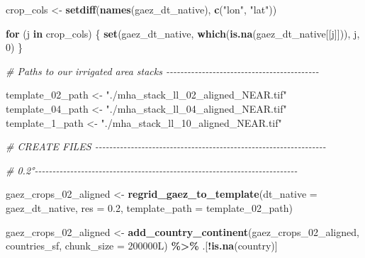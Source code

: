 \documentclass[
  11pt,
]{article}
\newenvironment{Shaded}{\begin{snugshade}}{\end{snugshade}}
\newcommand{\AttributeTok}[1]{\textcolor[rgb]{0.13,0.29,0.53}{#1}}
\newcommand{\CommentTok}[1]{\textcolor[rgb]{0.56,0.35,0.01}{\textit{#1}}}
\newcommand{\ControlFlowTok}[1]{\textcolor[rgb]{0.13,0.29,0.53}{\textbf{#1}}}
\newcommand{\DataTypeTok}[1]{\textcolor[rgb]{0.13,0.29,0.53}{#1}}
\newcommand{\DecValTok}[1]{\textcolor[rgb]{0.00,0.00,0.81}{#1}}
\newcommand{\FloatTok}[1]{\textcolor[rgb]{0.00,0.00,0.81}{#1}}
\newcommand{\FunctionTok}[1]{\textcolor[rgb]{0.13,0.29,0.53}{\textbf{#1}}}
\newcommand{\NormalTok}[1]{#1}
\newcommand{\OtherTok}[1]{\textcolor[rgb]{0.56,0.35,0.01}{#1}}
\newcommand{\SpecialCharTok}[1]{\textcolor[rgb]{0.81,0.36,0.00}{\textbf{#1}}}
\newcommand{\StringTok}[1]{\textcolor[rgb]{0.31,0.60,0.02}{#1}}
\begin{document}
\begin{Shaded}
\begin{Highlighting}[]
\NormalTok{crop\_cols }\OtherTok{\textless{}{-}} \FunctionTok{setdiff}\NormalTok{(}\FunctionTok{names}\NormalTok{(gaez\_dt\_native), }\FunctionTok{c}\NormalTok{(}\StringTok{"lon"}\NormalTok{, }\StringTok{"lat"}\NormalTok{))}

\ControlFlowTok{for}\NormalTok{ (j }\ControlFlowTok{in}\NormalTok{ crop\_cols) \{}
  \FunctionTok{set}\NormalTok{(gaez\_dt\_native, }\FunctionTok{which}\NormalTok{(}\FunctionTok{is.na}\NormalTok{(gaez\_dt\_native[[j]])), j, }\DecValTok{0}\NormalTok{)}
\NormalTok{\}}

\CommentTok{\# Paths to our irrigated area stacks {-}{-}{-}{-}{-}{-}{-}{-}{-}{-}{-}{-}{-}{-}{-}{-}{-}{-}{-}{-}{-}{-}{-}{-}{-}{-}{-}{-}{-}{-}{-}{-}{-}{-}{-}{-}{-}{-}{-}{-}{-}{-}{-}}

\NormalTok{template\_02\_path }\OtherTok{\textless{}{-}} \StringTok{"./mha\_stack\_ll\_02\_aligned\_NEAR.tif"}
\NormalTok{template\_04\_path }\OtherTok{\textless{}{-}} \StringTok{"./mha\_stack\_ll\_04\_aligned\_NEAR.tif"}
\NormalTok{template\_1\_path  }\OtherTok{\textless{}{-}} \StringTok{"./mha\_stack\_ll\_10\_aligned\_NEAR.tif"}

\CommentTok{\# CREATE FILES {-}{-}{-}{-}{-}{-}{-}{-}{-}{-}{-}{-}{-}{-}{-}{-}{-}{-}{-}{-}{-}{-}{-}{-}{-}{-}{-}{-}{-}{-}{-}{-}{-}{-}{-}{-}{-}{-}{-}{-}{-}{-}{-}{-}{-}{-}{-}{-}{-}{-}{-}{-}{-}{-}{-}{-}{-}{-}{-}{-}{-}{-}{-}{-}{-}}

\CommentTok{\# 0.2°{-}{-}{-}{-}{-}{-}{-}{-}{-}{-}{-}{-}{-}{-}{-}{-}{-}{-}{-}{-}{-}{-}{-}{-}{-}{-}{-}{-}{-}{-}{-}{-}{-}{-}{-}{-}{-}{-}{-}{-}{-}{-}{-}{-}{-}{-}{-}{-}{-}{-}{-}{-}{-}{-}{-}{-}{-}{-}{-}{-}{-}{-}{-}{-}{-}{-}{-}{-}{-}{-}{-}{-}{-}{-}}

\NormalTok{gaez\_crops\_02\_aligned }\OtherTok{\textless{}{-}} \FunctionTok{regrid\_gaez\_to\_template}\NormalTok{(}\AttributeTok{dt\_native =}\NormalTok{ gaez\_dt\_native,}
                                                 \AttributeTok{res =} \FloatTok{0.2}\NormalTok{,}
                                                 \AttributeTok{template\_path =}\NormalTok{ template\_02\_path)}

\NormalTok{gaez\_crops\_02\_aligned }\OtherTok{\textless{}{-}} \FunctionTok{add\_country\_continent}\NormalTok{(gaez\_crops\_02\_aligned, countries\_sf,}
                                               \AttributeTok{chunk\_size =} \DecValTok{200000}\DataTypeTok{L}\NormalTok{) }\SpecialCharTok{\%\textgreater{}\%}
\NormalTok{  .[}\SpecialCharTok{!}\FunctionTok{is.na}\NormalTok{(country)]}
\end{Highlighting}
\end{Shaded}
\end{document}
